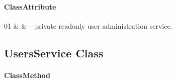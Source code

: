 \paragraph{ClassAttribute}
\begin{ClassAttributeTable}
01 &  &  -- private readonly user administration service. \\ \hline
\end{ClassAttributeTable}

\subsection{UsersService Class}

\paragraph{ClassMethod}
